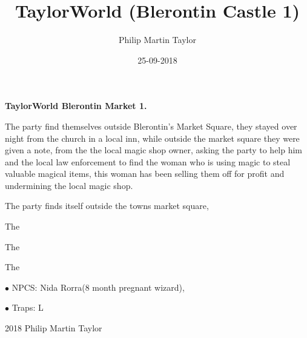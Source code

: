 \documentclass[12pt,a4paper]{book}
\date{25-09-2018}
\author{Philip Martin Taylor}
\title{TaylorWorld (Blerontin Castle 1)}
\begin{document}
\begin{center}
\textbf{TaylorWorld\texttrademark \: Blerontin Market 1.}
\end{center}
\begin{flushleft}
  The party find themselves outside Blerontin's Market Square, they stayed over night from the church in a local inn, while outside the market square they were given a note, from the the local magic shop owner, asking the party to help him and the local law enforcement to find the woman who is using magic to steal valuable magical items, this woman has been selling them off for profit and undermining the local magic shop. 
\end{flushleft}
\begin{flushleft}
  The party finds itself outside the towns market square, 
\end{flushleft}
\begin{flushleft}
  The
\end{flushleft}
\begin{flushleft}
  The
\end{flushleft}
\begin{flushleft}
  The
\end{flushleft}
\begin{flushleft}
\item[$\bullet$ NPCS:] Nida Rorra(8 month pregnant wizard),
  \item[$\bullet$ Traps:] L
\end{flushleft}
\begin{center}
  \textcopyright{} 2018 Philip Martin Taylor
\end{center}
\end{document}
